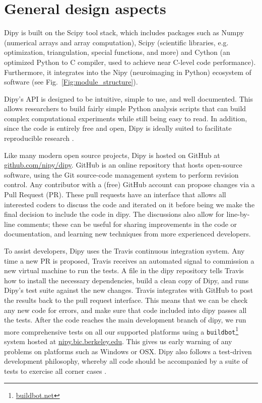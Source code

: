 \documentclass{bioinfo}
\begin{document}
\section{General design aspects}

Dipy is built on the Scipy tool stack, which includes packages such as
Numpy (numerical arrays and array computation), Scipy
(scientific libraries, e.g. optimization, triangulation, special functions,
and more) and Cython (an optimized Python to C compiler, used to achieve
near C-level code performance).  Furthermore, it integrates into the Nipy
(neuroimaging in Python) ecosystem of software (see
Fig.~\ref{Fig:module_structure}).

Dipy's API is designed to be intuitive, simple to use, and well
documented.  This allows researchers to build fairly simple Python analysis
scripts that can build complex computational experiments while still being easy
to read.  In addition, since the code is entirely free and open, Dipy is ideally
suited to facilitate reproducible research \citep{Donoho2010}.

Like many modern open source projects, Dipy is hosted on GitHub at
\url{github.com/nipy/dipy}. GitHub is an online
repository that hosts open-source software, using the Git source-code
management system to perform revision control. Any contributor with a (free)
GitHub account can propose changes via a Pull Request (PR). These pull requests
have an interface that allows all interested coders to discuss the code and
iterated on it before being we make the final decision to include the code in
dipy. The discussions also allow for line-by-line comments; these can be useful
for sharing improvements in the code or documentation, and learning new
techniques from more experienced developers.

To assist developers, Dipy uses the Travis continuous integration system.  Any
time a new PR is proposed, Travis receives an automated signal to commission a
new virtual machine to run the tests.  A file in the dipy repository tells
Travis how to install the necessary dependencies, build a clean copy of
Dipy, and runs Dipy's test suite against the new changes.  Travis integrates
with GitHub to post the results back to the pull request interface. This means
that we can be check any new code for errors, and make sure that code included
into dipy passes all the tests. After the code reaches the main development
branch of dipy, we run more comprehensive tests on all our supported
platforms using a \texttt{buildbot}\footnote{\url{buildbot.net}} system hosted at
\url{nipy.bic.berkeley.edu}. This gives us early warning of any problems on
platforms such as Windows or OSX.  Dipy also follows a test-driven development
philosophy, whereby all code should be accompanied by a suite of tests to
exercise all corner cases \citep{Maximilien2003}.
\end{document}
